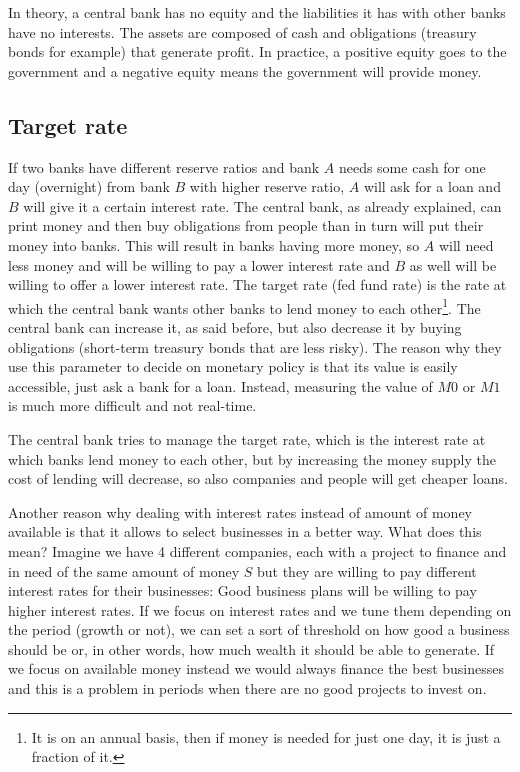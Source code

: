 In theory, a central bank has no equity and the liabilities it has with other banks have no interests. The assets are composed of cash and obligations (treasury bonds for example) that generate profit. In practice, a positive equity goes to the government and a negative equity means the government will provide money.

\subsection{Target rate}
If two banks have different reserve ratios and bank $A$ needs some cash for one day (overnight) from bank $B$ with higher reserve ratio, $A$ will ask for a loan and $B$ will give it a certain interest rate. The central bank, as already explained, can print money and then buy obligations from people than in turn will put their money into banks. This will result in banks having more money, so $A$ will need less money and will be willing to pay a lower interest rate and $B$ as well will be willing to offer a lower interest rate. The target rate (fed fund rate) is the rate at which the central bank wants other banks to lend money to each other\footnote{It is on an annual basis, then if money is needed for just one day, it is just a fraction of it.}. The central bank can increase it, as said before, but also decrease it by buying obligations (short-term treasury bonds that are less risky). The reason why they use this parameter to decide on monetary policy is that its value is easily accessible, just ask a bank for a loan. Instead, measuring the value of $M0$ or $M1$ is much more difficult and not real-time. 

The central bank tries to manage the target rate, which is the interest rate at which banks lend money to each other, but by increasing the money supply the cost of lending will decrease, so also companies and people will get cheaper loans.

Another reason why dealing with interest rates instead of amount of money available is that it allows to select businesses in a better way. What does this mean? Imagine we have 4 different companies, each with a project to finance and in need of the same amount of money $S$ but they are willing to pay different interest rates for their businesses: Good business plans will be willing to pay higher interest rates. If we focus on interest rates and we tune them depending on the period (growth or not), we can set a sort of threshold on how good a business should be or, in other words, how much wealth it should be able to generate. If we focus on available money instead we would always finance the best businesses and this is a problem in periods when there are no good projects to invest on. 


